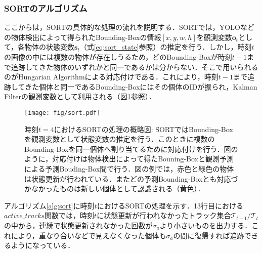         \subsubsection{SORTのアルゴリズム}
        ここからは，SORTの具体的な処理の流れを説明する．SORTでは，YOLOなどの物体検出によって得られたBounding-Boxの情報$\left[x, y, w, h\right]$を観測変数$\bm{o}_t$として，各物体の状態変数$\bm{s}_t$（式\ref{eq:sort_state}参照）の推定を行う．しかし，時刻$t$の画像の中には複数の物体が存在しうるため，どのBounding-Boxが時刻$t-1$まで追跡してきた物体のいずれかと同一であるかは分からない．そこで用いられるのがHungarian Algorithmによる対応付けである．これにより，時刻$t-1$まで追跡してきた個体と同一であるBounding-Boxにはその個体のIDが振られ，Kalman Filterの観測変数として利用される（図\ref{fig:sort}参照）．

        \begin{figure}[t]
            \centering
            \texttt{[image: fig/sort.pdf]}
            \caption[時刻$t=4$におけるSORTの処理の概略図]{時刻$t=4$におけるSORTの処理の概略図: SORTではBounding-Boxを観測変数として状態変数の推定を行う．このときに複数のBounding-Boxを同一個体へ割り当てるために対応付けを行う．図のように，対応付けは物体検出によって得たBouning-Boxと観測予測による予測Bouding-Box間で行う．図の例では，赤色と緑色の物体は状態更新が行われている．またどの予測Bounding-Boxとも対応づかなかったものは新しい個体として認識される（黄色）．}
            \label{fig:sort}
        \end{figure}

        アルゴリズム\ref{alg:sort}に時刻$t$におけるSORTの処理を示す．13行目における$active\_tracks$関数では，時刻$t$に状態更新が行われなかったトラック集合$\mathcal{T}_{t-1}/\mathcal{T}_t$の中から，連続で状態更新されなかった回数が$\sigma_a$より小さいものを出力する．これにより，重なり合いなどで見えなくなった個体も$\sigma_a$の間に復帰すれば追跡できるようになっている．

